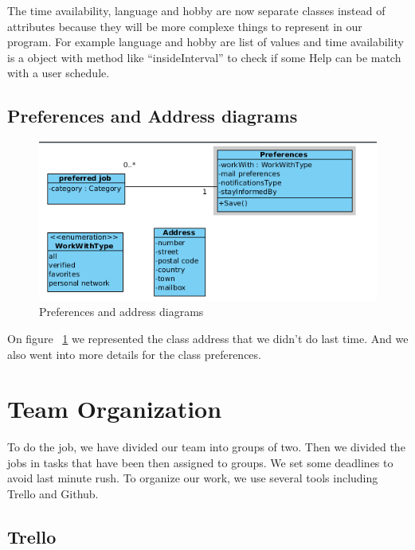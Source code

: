 \documentclass[11pt, a4paper]{article}   	%
\begin{document}
The time availability, language and hobby are now separate classes instead of attributes because they will be more complexe things to represent in our program. For example language and hobby are list of values and time availability is a object with method like \enquote{insideInterval} to check if some Help can be match with a user schedule.

\subsection{Preferences and Address diagrams}

\begin{figure}[!ht]
 \includegraphics[width=\textwidth]{preferences.png}
   \caption{\label{preferences} Preferences and address diagrams}
\end{figure}

On figure ~\ref{preferences} we represented the class address that we didn't do last time. And we also went into more details
for the class preferences.



\section{Team Organization}

To do the job, we have divided our team into groups of two.
Then we divided the jobs in tasks that have been then assigned to groups.
We set some deadlines to avoid last minute rush.
To organize our work, we use several tools including Trello and Github. 

\subsection{Trello}
\end{document}
